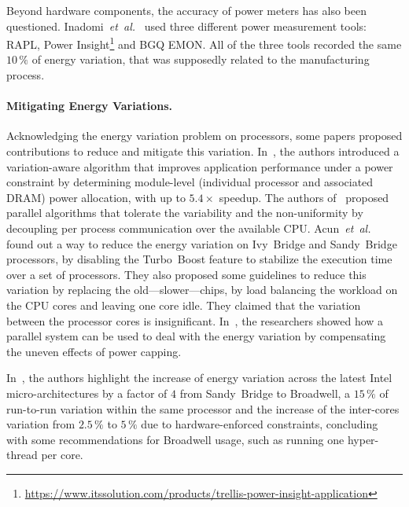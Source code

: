 Beyond hardware components, the accuracy of power meters has also been questioned.
Inadomi~\emph{et~al.}~\cite{inadomi_analyzing_2015} used three different power measurement tools: RAPL, Power Insight\footnote{\url{https://www.itssolution.com/products/trellis-power-insight-application}} and BGQ EMON.
All of the three tools recorded the same $10\,\%$ of energy variation, that was supposedly related to the manufacturing process.

\paragraph{Mitigating Energy Variations.}
Acknowledging the energy variation problem on processors, some papers proposed contributions to reduce and mitigate this variation.
In~\cite{inadomi_analyzing_2015}, the authors introduced a variation-aware algorithm that improves application performance under a power constraint by determining module-level (individual processor and associated DRAM) power allocation, with up to $5.4\times$ speedup.
The authors of~\cite{hammouda_noise-tolerant_2015} proposed parallel algorithms that tolerate the variability and the non-uniformity by decoupling per process communication over the available CPU.
Acun~\emph{et~al.}~\cite{acun_variation_2016} found out a way to reduce the energy variation on Ivy~Bridge and Sandy~Bridge processors, by disabling the Turbo~Boost feature to stabilize the execution time over a set of processors.
They also proposed some guidelines to reduce this variation by replacing the old---slower---chips, by load balancing the workload on the CPU cores and leaving one core idle.
They claimed that the variation between the processor cores is insignificant.
In~\cite{chasapis_runtime-guided_2016}, the researchers showed how a parallel system can be used to deal with the energy variation by compensating the uneven effects of power capping.

In~\cite{marathe_empirical_2017_m}, the authors highlight the increase of energy variation across the latest Intel micro-architectures by a factor of $4$ from Sandy~Bridge to Broadwell, a $15\,\%$ of run-to-run variation within the same processor and the increase of the inter-cores variation from $2.5\,\%$ to $5\,\%$ due to hardware-enforced constraints, concluding with some recommendations for Broadwell usage, such as running one hyper-thread per core.


